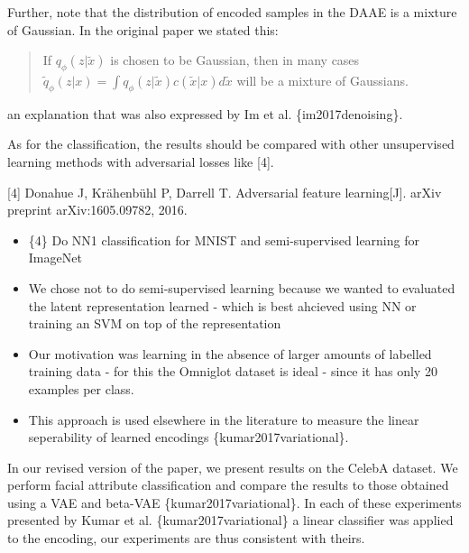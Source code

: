 \documentclass{article}
\begin{document}
Further, note that the distribution of encoded samples in the DAAE is a mixture of Gaussian. In the original paper we stated this:

\begin{quote}
If $q_\phi(z|\tilde{x})$ is chosen to be Gaussian, then in many cases $\tilde{q}_\phi(z|x) = \int q_\phi(z|\tilde{x})c(\tilde{x}|x)d \tilde{x}$ will be a mixture of Gaussians.
\end{quote}
an explanation that was also expressed by Im et al. \{im2017denoising\}.\\



{\color{blue}
As for the classification, the results should be compared with other unsupervised learning methods with adversarial losses like [4].

[4] Donahue J, Krähenbühl P, Darrell T. Adversarial feature learning[J]. arXiv preprint arXiv:1605.09782, 2016.}

\begin{itemize}
    \item \{4\} Do NN1 classification for MNIST and semi-supervised learning for ImageNet
    \item We chose not to do semi-supervised learning because we wanted to evaluated the latent representation learned - which is best ahcieved using NN or training an SVM on top of the representation
    \item Our motivation was learning in the absence of larger amounts of labelled training data - for this the Omniglot dataset is ideal - since it has only 20 examples per class.
    \item This approach is used elsewhere in the literature to measure the linear seperability of learned encodings \{kumar2017variational\}.
\end{itemize}

In our revised version of the paper, we present results on the CelebA dataset. We perform facial attribute classification and compare the results to those obtained using a VAE and beta-VAE \{kumar2017variational\}. In each of these experiments presented by Kumar et al. \{kumar2017variational\} a linear classifier was applied to the encoding, our experiments are thus consistent with theirs.
\end{document}
